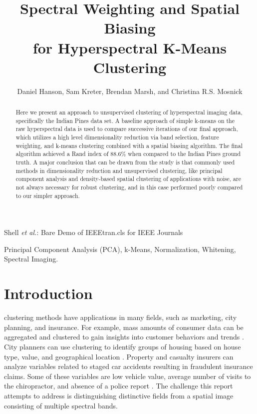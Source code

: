 \documentclass[journal]{IEEEtran}
\begin{document}
\title{Spectral Weighting and Spatial Biasing\\ for Hyperspectral K-Means Clustering}


\author{Daniel Hanson, Sam Kreter, Brendan Marsh, and Christina R.S. Mosnick}

{Shell \MakeLowercase{\textit{et al.}}: Bare Demo of IEEEtran.cls for IEEE Journals}

\maketitle

\begin{abstract}
Here we present an approach to unsupervised clustering of hyperspectral imaging data, specifically the Indian Pines data set. A baseline approach of simple k-means on the raw hyperspectral data is used to compare successive iterations of our final approach, which utilizes a high level dimensionality reduction via band selection, feature weighting, and k-means clustering combined with a spatial biasing algorithm. The final algorithm achieved a Rand index of 88.6\% when compared to the Indian Pines ground truth. A major conclusion that can be drawn from the study is that commonly used methods in dimensionality reduction and unsupervised clustering, like principal component analysis and density-based spatial clustering of applications with noise, are not always necessary for robust clustering, and in this case performed poorly compared to our simpler approach.
\end{abstract}

\begin{IEEEkeywords}
    Principal Component Analysis (PCA), k-Means, Normalization, Whitening, Spectral Imaging.
\end{IEEEkeywords}

\IEEEpeerreviewmaketitle

\section{Introduction}

 clustering methods have applications in many fields, such as marketing, city planning, and insurance. For example, mass amounts of consumer data can be aggregated and clustered to gain insights into customer behaviors and trends \cite{ClusterTutorial}. City planners can use clustering to identify groups of housing based on house type, value, and geographical location \cite{ClusterTutorial}. Property and casualty insurers can analyze variables related to staged car accidents resulting in fraudulent insurance claims. Some of these variables are low vehicle value, average number of visits to the chiropractor, and absence of a police report \cite{FraudAnalysis}. The challenge this report attempts to address is distinguishing distinctive fields from a spatial image consisting of multiple spectral bands.\\
\end{document}
